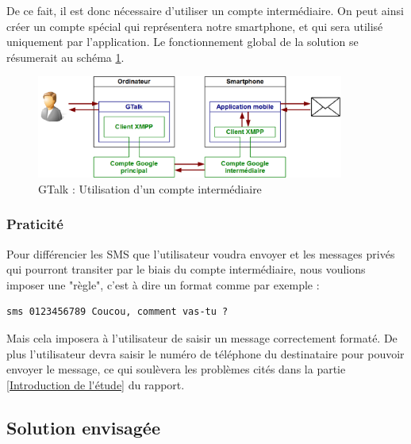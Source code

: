 De ce fait, il est donc nécessaire d'utiliser un compte intermédiaire.
On peut ainsi créer un compte spécial qui représentera notre smartphone, et qui sera utilisé uniquement par l'application.
Le fonctionnement global de la solution se résumerait au schéma \ref{schemaFonctionnement_GTalk}.

\begin{figure}[!h]
	\center
	\includegraphics[width=0.9\textwidth]{img/schemaFonctionnement_GTalk.png}
	\caption{GTalk : Utilisation d'un compte intermédiaire}
	\label{schemaFonctionnement_GTalk}
\end{figure}


\subsubsection{Praticité}

Pour différencier les SMS que l'utilisateur voudra envoyer et les messages privés qui pourront transiter par le biais du compte intermédiaire, nous voulions imposer une "règle", c'est à dire un format comme par exemple :
\begin{lstlisting}
sms 0123456789 Coucou, comment vas-tu ?
\end{lstlisting}

Mais cela imposera à l'utilisateur de saisir un message correctement formaté.
De plus l'utilisateur devra saisir le numéro de téléphone du destinataire pour pouvoir envoyer le message, ce qui soulèvera les problèmes cités dans la partie \ref{Introduction de l'étude} du rapport.




\subsection{Solution envisagée}

